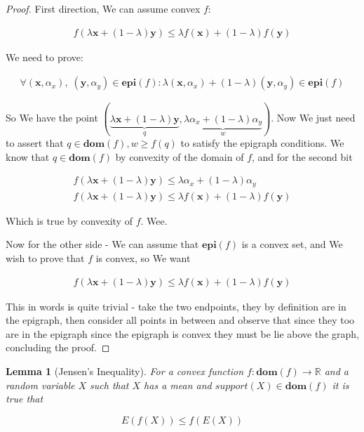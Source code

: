 \documentclass{article}
\newtheorem{lemma}[theorem]{Lemma}
\begin{document}
	\begin{proof}
		First direction, We can assume convex $f$:
		
		\begin{align*}
			f(\lambda\mathbf{x} + (1-\lambda)\mathbf{y}) \le \lambda f(\mathbf{x}) + (1-\lambda)f(\mathbf{y})
		\end{align*}
		
		We need to prove:
		
		\begin{align*}
			\forall (\mathbf{x}, \alpha_x),\; (\mathbf{y}, \alpha_y)\in\mathbf{epi}(f): \lambda(\mathbf{x}, \alpha_x)+(1-\lambda)(\mathbf{y}, \alpha_y) \in\mathbf{epi}(f)
		\end{align*}
		
		So We have the point $(\underbrace{\lambda\mathbf{x} + (1-\lambda)\mathbf{y}}_q, \underbrace{\lambda\alpha_x + (1-\lambda)\alpha_y}_w)$. Now We just need to assert that $q\in\mathbf{dom}(f), w\ge f(q)$ to satisfy the epigraph conditions. We know that $q\in\mathbf{dom}(f)$ by convexity of the domain of $f$, and for the second bit
		
		\begin{align*}
			f(\lambda\mathbf{x} + (1-\lambda)\mathbf{y}) \le \lambda \alpha_x + (1-\lambda)\alpha_y\\
			f(\lambda\mathbf{x} + (1-\lambda)\mathbf{y}) \le \lambda f(\mathbf{x}) + (1-\lambda)f(\mathbf{y})
		\end{align*}
		
		Which is true by convexity of $f$. Wee.
		
		Now for the other side - We can assume that $\mathbf{epi}(f)$ is a convex set, and We wish to prove that $f$ is convex, so We want
		
		\begin{align*}
			f(\lambda\mathbf{x} + (1-\lambda)\mathbf{y}) \le \lambda f(\mathbf{x}) + (1-\lambda)f(\mathbf{y})
		\end{align*}
		
		This in words is quite trivial - take the two endpoints, they by definition are in the epigraph, then consider all points in between and observe that since they too are in the epigraph since the epigraph is convex they must be lie above the graph, concluding the proof.
	\end{proof}
	
	\begin{lemma}[Jensen's Inequality]
		For a convex function $f:\mathbf{dom}(f)\to\mathbb{R}$ and a random variable $X$ such that $X$ has a mean and $support(X)\in\mathbf{dom}(f)$ it is true that
		
		\[ E(f(X)) \le f(E(X))\]
	\end{lemma}
	
\end{document}
